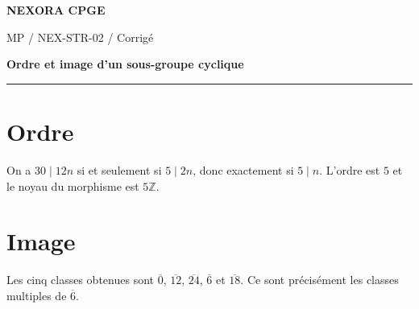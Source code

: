 \documentclass[11pt,a4paper]{article}
\begin{document}
{\small\bfseries\color{nexorablue} NEXORA CPGE}\par
{\small MP / NEX-STR-02 / Corrigé}\par
{\LARGE\bfseries Ordre et image d’un sous-groupe cyclique}\par
\vspace{0.25em}\hrule\vspace{0.6em}

\section*{Ordre}
On a $30\mid12n$ si et seulement si $5\mid2n$, donc exactement si $5\mid n$. L’ordre est $5$ et le noyau du morphisme est $5\mathbb Z$.

\section*{Image}
Les cinq classes obtenues sont $\overline0$, $\overline{12}$, $\overline{24}$, $\overline6$ et $\overline{18}$. Ce sont précisément les classes multiples de $\overline6$.
\end{document}
